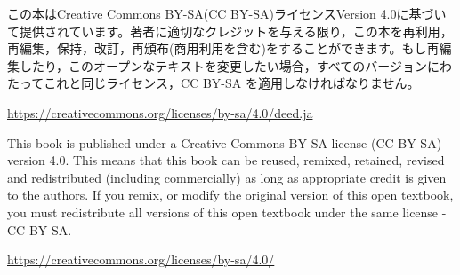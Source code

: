 

\clearpage
\newpage

\vspace*{40pt}

\begin{center}
	この本はCreative Commons BY-SA(CC BY-SA)ライセンスVersion 4.0に基づいて提供されています。著者に適切なクレジットを与える限り，この本を再利用，再編集，保持，改訂，再頒布(商用利用を含む)をすることができます。もし再編集したり，このオープンなテキストを変更したい場合，すべてのバージョンにわたってこれと同じライセンス，CC BY-SA を適用しなければなりません。

	\url{https://creativecommons.org/licenses/by-sa/4.0/deed.ja}

	\vspace*{10pt}

	This book is published under a Creative Commons BY-SA license (CC BY-SA) version 4.0. This means that this book can be reused, remixed, retained, revised and redistributed (including commercially) as long as appropriate credit is given to the authors. If you remix, or modify the original version of this open textbook, you must redistribute all versions of this open textbook under the same license - CC BY-SA.

	\vspace*{18pt}

	\url{https://creativecommons.org/licenses/by-sa/4.0/}
\end{center}

\newpage